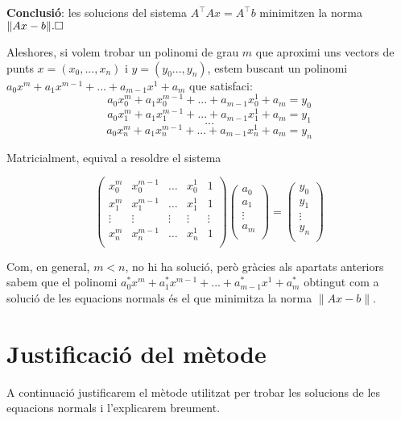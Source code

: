 \documentclass{article}
\begin{document}
\textbf{Conclusió}: les solucions del sistema $  A^\top Ax= A^\top b $ minimitzen la norma $ \| Ax - b \|. \hfill \square$ \newline

Aleshores, si volem trobar un polinomi de grau $m$ que aproximi  uns vectors de punts $ x = \left(x_0,...,x_n\right) $ i $y = \left(y_0...,y_n\right)$, estem buscant un polinomi $a_0x^m+a_1x^{m-1}+...+a_{m-1}x^1+a_{m}$ que satisfaci:
$$ a_0x_{0}^{m}+a_1x_{0}^{m-1}+...+a_{m-1}x_{0}^1+a_{m} = y_0 $$
$$ a_0x_{1}^{m}+a_1x_{1}^{m-1}+...+a_{m-1}x_{1}^1+a_{m} = y_1 $$
$$...$$
$$ a_0x_{n}^{m}+a_1x_{n}^{m-1}+...+a_{m-1}x_{n}^1+a_{m} = y_n $$

Matricialment, equival a resoldre el sistema

$$
\label{def:matriu:A}
\left(
\begin{array}{ccccccc}
x_{0}^{m}   &  x_{0}^{m-1}  &   \dots    & x_{0}^1        &    1 \\
x_{1}^{m}   &  x_{1}^{m-1}  &   \dots    & x_{1}^1        &    1 \\
 \vdots  &  \vdots  &  \vdots   &     \vdots    &     \vdots \\
x_{n}^{m}   &  x_{n}^{m-1}  &   \dots    & x_{n}^1        &    1 \\
\end{array}
\right)
\left(
\begin{array}{ccccccc}
a_{0} \\
a_{1} \\
 \vdots \\
a_{m}  \\
\end{array}
\right)=
\left(
\begin{array}{ccccccc}
y_{0} \\
y_{1} \\
 \vdots \\
y_{n}  \\
\end{array}
\right)
$$

Com, en general, $m < n$, no hi ha solució, però gràcies als apartats anteriors sabem que el polinomi $a_0^*x^m+a_1^*x^{m-1}+...+a_{m-1}^*x^1+a_{m}^*$ obtingut com a solució de les equacions normals és el que minimitza la norma $ \| Ax - b \|$.

\section{Justificació del mètode}
A continuació justificarem el mètode utilitzat per trobar les solucions de les equacions normals i l'explicarem breument.
\end{document}
